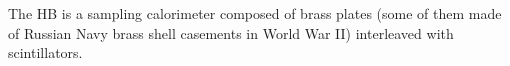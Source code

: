 The HB is a sampling calorimeter composed of brass plates (some of them made of Russian Navy brass shell casements in World War II) 
interleaved with scintillators.
% 
